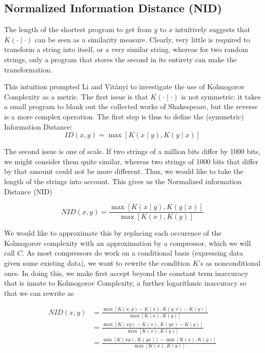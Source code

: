 \documentclass[10pt,a4paper,oneside]{article}
\begin{document}
\subsection*{Normalized Information Distance (NID)}

The length of the shortest program to get from $y$ to $x$ intuitively suggests that $K(\cdot\mid \cdot)$ can be seen as a similarity measure. Clearly, very little is required to transform a string into itself, or a very similar string, whereas for two random strings, only a program that stores the second in its entirety can make the transformation.

This intuition prompted Li and Vit{\'a}nyi \cite{li2004similarity} to investigate the use of Kolmogorov Complexity as a metric. The first issue is that $K(\cdot\mid \cdot)$ is not symmetric: it takes a small program to blank out the collected works of Shakespeare, but the reverse is a more complex operation. The first step is thus to define the (symmetric) Information Distance:
\[
ID(x, y) = \max \left [K(x\mid y),K(y\mid x) \right ] 
\]  

The second issue is one of scale. If two strings of a million bits differ by 1000 bits, we might consider them quite similar, whereas two strings of 1000 bits that differ by that amount could not be more different. Thus, we would like to take the length of the strings into account. This gives us the Normalized information Distance (NID)

\[
NID(x, y) = \frac{\max \left [K(x \mid y),K(y \mid x) \right ] }{\max \left [K(x), K(y) \right ]}
\] 

We would like to approximate this by replacing each occurence of the Kolmogorov complexity with an approximation by a compressor, which we will call $C$. As most compressors do work on a conditional basis (expressing data given some existing data), we want to rewrite the condition $K$'s as nonconditional ones. In doing this, we make first accept beyond the constant term inaccuracy that is innate to Kolmogorov Complexity, a further logarithmic inaccuracy so that we can rewrite as

\begin{align*}
NID(x, y)	 &= \frac{\max \left [K(x, y) - K(x),K(y, x) - K(y)\right ] }{\max \left [K(x), K(y) \right ]} \\ 
	&= \frac{\max \left [K(xy) - K(x),K(yx) - K(y)\right ] } {\max \left [K(x), K(y) \right ]} \\
	&= \frac{\min \left [K(xy), K(yx)\right ] - \min \left[K(x), K(y)\right]}{\max \left [K(x), K(y) \right ]} 
\end{align*}
\end{document}
